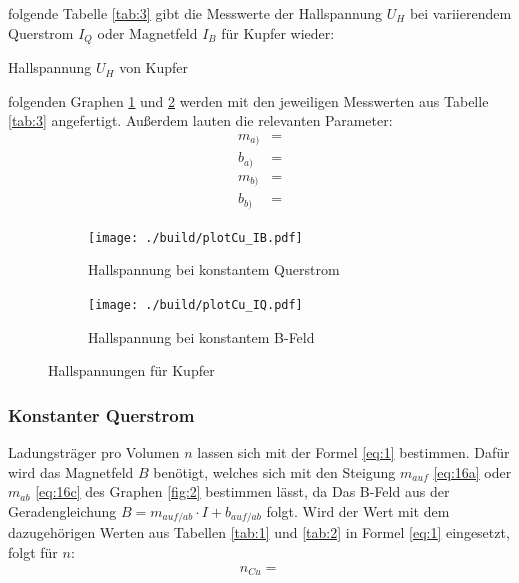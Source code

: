 \justifying folgende Tabelle \ref{tab:3} gibt die Messwerte der Hallspannung $U_H$ bei variierendem Querstrom $I_Q$ oder Magnetfeld
$I_B$ für Kupfer wieder:

\begin{table}[H]
    \centering
    
    \caption{Hallspannung $U_H$ von Kupfer}
    \label{tab:3}
\end{table}

\justifying folgenden Graphen \ref{fig:3a} und \ref{fig:3b} werden mit den jeweiligen Messwerten aus Tabelle \ref{tab:3} 
angefertigt. Außerdem lauten die relevanten Parameter: 
\begin{subequations} \label{eq:17}
\begin{align}
    m_{a)} &= \text{} \label{eq:17a}\\
    b_{a)} &= \text{} \label{eq:17b}\\
    m_{b)} &= \text{} \label{eq:17c}\\
    b_{b)} &= \text{} \label{eq:17d}
\end{align}
\end{subequations}

\begin{figure}[H]
\begin{subfigure}{0.495\linewidth}
\centering
\texttt{[image: ./build/plotCu\_IB.pdf]}
\caption{Hallspannung bei konstantem Querstrom}
\label{fig:3a}
\end{subfigure}
\begin{subfigure}{0.495\linewidth}
\centering
\texttt{[image: ./build/plotCu\_IQ.pdf]}
\caption{Hallspannung bei konstantem B-Feld}
\label{fig:3b}
\end{subfigure}
\caption{Hallspannungen für Kupfer}
\label{fig:3}
\end{figure}

\subsubsection{Konstanter Querstrom} \label{sec:5.3.1}
 
\justifying Ladungsträger pro Volumen $n$ lassen sich mit der Formel \eqref{eq:1} bestimmen. Dafür wird das Magnetfeld $B$
benötigt, welches sich mit den Steigung $m_{auf}$ \eqref{eq:16a} oder $m_{ab}$ \eqref{eq:16c} des Graphen \ref{fig:2} bestimmen lässt, da 
Das B-Feld aus der Geradengleichung $B = m_{auf/ab} \cdot I + b_{auf/ab}$ folgt. Wird der Wert mit dem dazugehörigen Werten aus
Tabellen \ref{tab:1} und \ref{tab:2} in Formel \eqref{eq:1} eingesetzt, folgt für $n$:
\begin{align}
    n_{Cu} = \text{} \label{eq:18}
\end{align}

